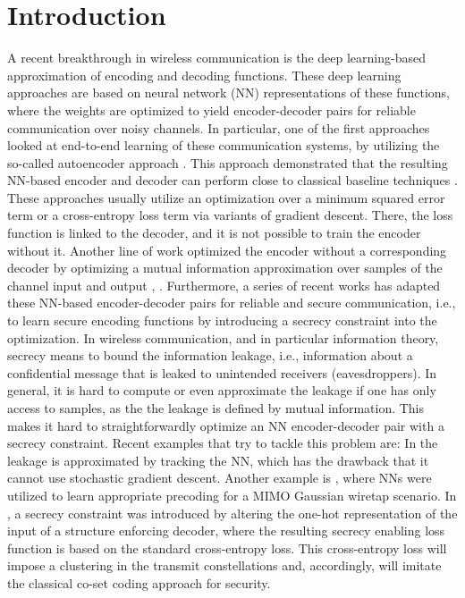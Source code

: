\documentclass[conference, 10pt]{IEEEtran}
\begin{document}
\section{Introduction}
\label{sec:intro}
A recent breakthrough in wireless communication is the deep learning-based approximation of encoding and decoding functions. These deep learning approaches are based on neural network (NN) representations of these functions, where the weights are optimized to yield encoder-decoder pairs for reliable communication over noisy channels. In particular, one of the first approaches looked at end-to-end learning of these communication systems, by utilizing the so-called autoencoder approach \cite{OShea2017}. This approach demonstrated that the resulting NN-based encoder and decoder can perform close to classical baseline techniques \cite{SBrink2018}. These approaches usually utilize an optimization over a minimum squared error term or a cross-entropy loss term via variants of gradient descent. There, the loss function is linked to the decoder, and it is not possible to train the encoder without it. Another line of work optimized the encoder without a corresponding decoder by optimizing a mutual information approximation over samples of the channel input and output \cite{Fritschek_SPAWC19}, \cite{Fritschek_SPAWC20}. Furthermore, a series of recent works has adapted these NN-based encoder-decoder pairs for reliable and secure communication, i.e., to learn secure encoding functions by introducing a secrecy constraint into the optimization. In wireless communication, and in particular information theory, secrecy means to bound the information leakage, i.e., information about a confidential message that is leaked to unintended receivers (eavesdroppers). In general, it is hard to compute or even approximate the leakage if one has only access to samples, as the the leakage is defined by mutual information. This makes it hard to straightforwardly optimize an NN encoder-decoder pair with a secrecy constraint. Recent examples that try to tackle this problem are: In \cite{Karl_ICASSP} the leakage is approximated by tracking the NN, which has the drawback that it cannot use stochastic gradient descent. Another example is \cite{zhang2019deep}, where NNs were utilized to learn appropriate precoding for a MIMO Gaussian wiretap scenario. In \cite{ICC_DL_Sec}, a secrecy constraint was introduced by altering the one-hot representation of the input of a structure enforcing decoder, where the resulting secrecy enabling loss function is based on the standard cross-entropy loss. This cross-entropy loss will impose a clustering in the transmit constellations and, accordingly, will imitate the classical co-set coding approach for security. 
\end{document}
